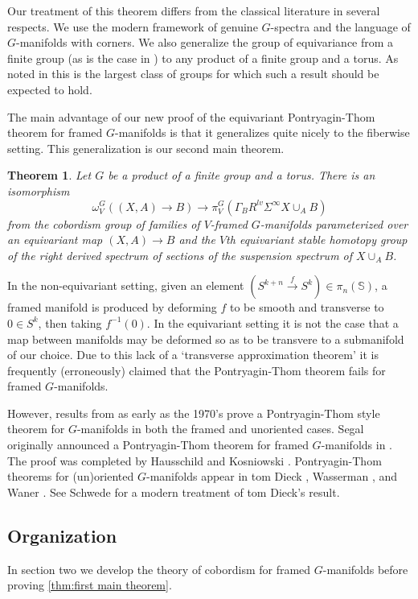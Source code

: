 \documentclass[11pt]{amsart}
\newcommand{\Sph}{\mathbb{S}}
\theoremstyle{plain}   %
\newtheorem{thm}{Theorem}[section] %
\theoremstyle{definition}
\theoremstyle{remark}
\numberwithin{equation}{section}
\begin{document}
Our treatment of this theorem differs from the classical literature in several respects. We use the modern framework of genuine $G$-spectra and the language of $G$-manifolds with corners. We also generalize the group of equivariance from a finite group (as is the case in \cite{kosniowski_bordism}) to any product of a finite group and a torus. As noted in \cite[6.2.13]{schwede_global} this is the largest class of groups for which such a result should be expected to hold.

The main advantage of our new proof of the equivariant Pontryagin-Thom theorem for framed $G$-manifolds is that it generalizes quite nicely to the fiberwise setting. This generalization is our second main theorem. 

\begin{thm}\label{thm:second main theorem}
Let $G$ be a product of a finite group and a torus. There is an isomorphism 
\[
\omega_V^G((X,A)\to B) \to \pi_V^G(\Gamma_BR^{lv}\Sigma^\infty X\cup_A B)
\]
from the cobordism group of families of $V$-framed $G$-manifolds parameterized over an equivariant map $(X,A)\to B$ and the $V$th equivariant stable homotopy group of the right derived spectrum of sections of the suspension spectrum of $X\cup_A B$. 
\end{thm}

In the non-equivariant setting, given an element $(S^{k+n}\xrightarrow{f} S^k)\in \pi_n(\Sph)$, a framed manifold is produced by deforming $f$ to be smooth and transverse to $0\in S^k$, then taking $f^{-1}(0)$. In the equivariant setting it is not the case that a map between manifolds may be deformed so as to be transvere to a submanifold of our choice. Due to this lack of a `transverse approximation theorem' it is frequently (erroneously) claimed that the Pontryagin-Thom theorem fails for framed $G$-manifolds. 

However, results from as early as the 1970's prove a Pontryagin-Thom style theorem for $G$-manifolds in both the framed and unoriented cases. Segal originally announced a Pontryagin-Thom theorem for framed $G$-manifolds in \cite{segal1970equivariant}. The proof was completed by Hausschild \cite{Hausschild1974} and Kosniowski \cite{kosniowski_bordism}. Pontryagin-Thom theorems for (un)oriented $G$-manifolds appear in tom Dieck \cite{tomDieckEquivariantBordism}, Wasserman \cite{wasserman}, and Waner \cite{waner_1984_eq_bordism}. See Schwede \cite{schwede_global} for a modern treatment of tom Dieck's result.


\subsection*{Organization}
In section two we develop the theory of cobordism for framed $G$-manifolds before proving \cref{thm:first main theorem}. 
\end{document}
